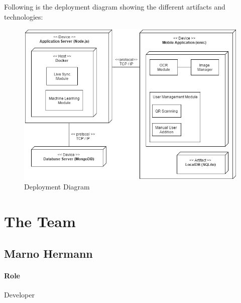 \documentclass{article}
\begin{document}
Following is the deployment diagram showing the different artifacts and technologies:\newline
\begin{figure}[h]
	\centering
		\includegraphics[scale=0.7]{img/Compiax.png}
		\caption{Deployment Diagram}	
	\end{figure}
            
\newpage
\section{The Team}
    \subsection{Marno Hermann}
        \paragraph{Role} Developer
    
\end{document}

